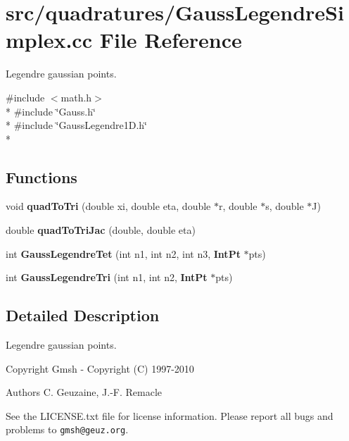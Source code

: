 \section{src/quadratures/\-Gauss\-Legendre\-Simplex.cc File Reference}
\label{GaussLegendreSimplex_8cc}


Legendre gaussian points.  


{\ttfamily \#include $<$math.\-h$>$}\\*
{\ttfamily \#include \char`\"{}Gauss.\-h\char`\"{}}\\*
{\ttfamily \#include \char`\"{}Gauss\-Legendre1\-D.\-h\char`\"{}}\\*
\subsection*{Functions}
\begin{DoxyCompactItemize}
\item 
void {\bfseries quad\-To\-Tri} (double xi, double eta, double $\ast$r, double $\ast$s, double $\ast$J)\label{GaussLegendreSimplex_8cc_a069792b2a1745149d9e2dccb7ebf3953}

\item 
double {\bfseries quad\-To\-Tri\-Jac} (double, double eta)\label{GaussLegendreSimplex_8cc_a6f35576bff4c9ada294d7c5593d47270}

\item 
int {\bfseries Gauss\-Legendre\-Tet} (int n1, int n2, int n3, {\bf Int\-Pt} $\ast$pts)\label{GaussLegendreSimplex_8cc_a0a45c641c0216cdc57a80da9fd7b2c24}

\item 
int {\bfseries Gauss\-Legendre\-Tri} (int n1, int n2, {\bf Int\-Pt} $\ast$pts)\label{GaussLegendreSimplex_8cc_af732a5b5fbf6c48182632757d5f19477}

\end{DoxyCompactItemize}


\subsection{Detailed Description}
Legendre gaussian points. \begin{DoxyCopyright}{Copyright}
Gmsh -\/ Copyright (C) 1997-\/2010 
\end{DoxyCopyright}
\begin{DoxyAuthor}{Authors}
C. Geuzaine, J.-\/\-F. Remacle
\end{DoxyAuthor}
See the L\-I\-C\-E\-N\-S\-E.\-txt file for license information. Please report all bugs and problems to {\tt gmsh@geuz.\-org}. 